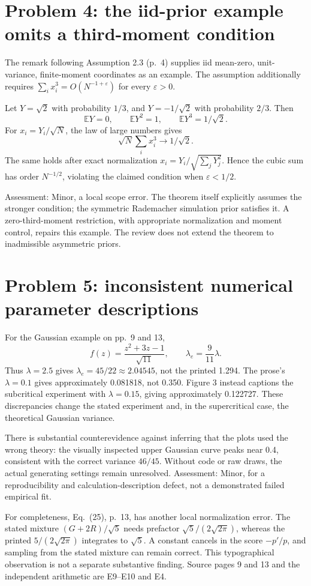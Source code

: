 \documentclass[10pt]{article}
\begin{document}
\section*{Problem 4: the iid-prior example omits a third-moment condition}
The remark following Assumption 2.3 (p. 4) supplies iid mean-zero, unit-variance, finite-moment coordinates as an example. The assumption additionally requires \(\sum_i x_i^3=O(N^{-1+\varepsilon})\) for every \(\varepsilon>0\).\par
Let \(Y=\sqrt2\) with probability \(1/3\), and \(Y=-1/\sqrt2\) with probability \(2/3\). Then \[\mathbb EY=0,\qquad\mathbb EY^2=1,\qquad\mathbb EY^3=1/\sqrt2.\] For \(x_i=Y_i/\sqrt N\), the law of large numbers gives \[\sqrt N\sum_i x_i^3\to1/\sqrt2.\] The same holds after exact normalization \(x_i=Y_i/\sqrt{\sum_jY_j^2}\). Hence the cubic sum has order \(N^{-1/2}\), violating the claimed condition when \(\varepsilon<1/2\).\par
Assessment: Minor, a local scope error. The theorem itself explicitly assumes the stronger condition; the symmetric Rademacher simulation prior satisfies it. A zero-third-moment restriction, with appropriate normalization and moment control, repairs this example. The review does not extend the theorem to inadmissible asymmetric priors.\par
\section*{Problem 5: inconsistent numerical parameter descriptions}
For the Gaussian example on pp. 9 and 13, \[f(z)=\frac{z^2+3z-1}{\sqrt{11}},\qquad\lambda_e=\frac9{11}\lambda.\] Thus \(\lambda=2.5\) gives \(\lambda_e=45/22\approx2.04545\), not the printed 1.294. The prose’s \(\lambda=0.1\) gives approximately 0.081818, not 0.350. Figure 3 instead captions the subcritical experiment with \(\lambda=0.15\), giving approximately 0.122727. These discrepancies change the stated experiment and, in the supercritical case, the theoretical Gaussian variance.\par
There is substantial counterevidence against inferring that the plots used the wrong theory: the visually inspected upper Gaussian curve peaks near 0.4, consistent with the correct variance \(46/45\). Without code or raw draws, the actual generating settings remain unresolved. Assessment: Minor, for a reproducibility and calculation-description defect, not a demonstrated failed empirical fit.\par
For completeness, Eq. (25), p. 13, has another local normalization error. The stated mixture \((G+2R)/\sqrt5\) needs prefactor \(\sqrt5/(2\sqrt{2\pi})\), whereas the printed \(5/(2\sqrt{2\pi})\) integrates to \(\sqrt5\). A constant cancels in the score \(-p'/p\), and sampling from the stated mixture can remain correct. This typographical observation is not a separate substantive finding. Source pages 9 and 13 and the independent arithmetic are E9–E10 and E4.\par
\end{document}
